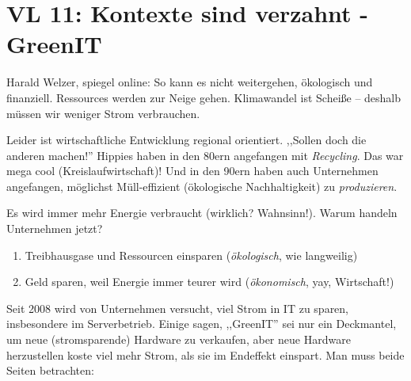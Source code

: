 \newpage
\section{VL 11: Kontexte sind verzahnt - GreenIT}

Harald Welzer, spiegel online: So kann es nicht weitergehen, ökologisch und
finanziell. Ressources werden zur Neige gehen.  Klimawandel ist Scheiße --
deshalb müssen wir weniger Strom verbrauchen.

Leider ist wirtschaftliche Entwicklung regional orientiert. ,,Sollen doch die anderen
machen!'' Hippies haben in den 80ern angefangen mit \emph{Recycling}. Das war mega
cool (Kreislaufwirtschaft)! Und in den 90ern haben auch Unternehmen angefangen, möglichst
Müll-effizient (ökologische Nachhaltigkeit) zu \emph{produzieren}.

Es wird immer mehr Energie verbraucht (wirklich? Wahnsinn!). Warum handeln Unternehmen
jetzt?

\begin{enumerate}
\item Treibhausgase und Ressourcen einsparen (\emph{ökologisch}, wie langweilig)
\item Geld sparen, weil Energie immer teurer wird (\emph{ökonomisch}, yay, Wirtschaft!)
\end{enumerate}

Seit 2008 wird von Unternehmen versucht, viel Strom in IT zu sparen, insbesondere
im Serverbetrieb. Einige sagen, ,,GreenIT'' sei nur ein Deckmantel, um neue (stromsparende) Hardware
zu verkaufen, aber neue Hardware herzustellen koste viel mehr Strom, als sie im
Endeffekt einspart. Man muss beide Seiten betrachten:

